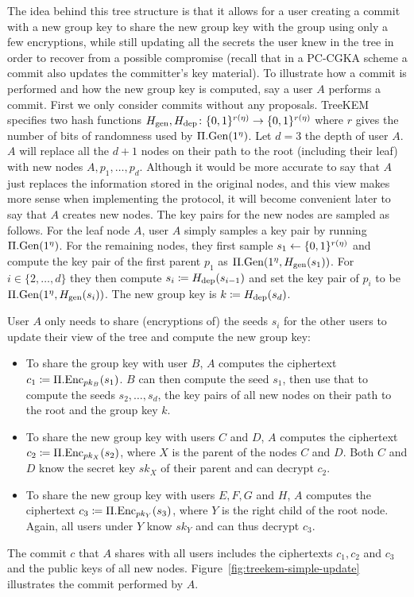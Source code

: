 The idea behind this tree structure is that it allows for a user creating a commit with a new group key to share the new group key with the group using only a few encryptions, while still updating all the secrets the user knew in the tree in order to recover from a possible compromise (recall that in a PC-CGKA scheme a commit also updates the committer's key material).
To illustrate how a commit is performed and how the new group key is computed, say a user $A$ performs a commit. First we only consider commits without any proposals. TreeKEM specifies two hash functions $H_\mathrm{gen}, H_\mathrm{dep} \colon \{0, 1\}^{r(\eta)} \to \{0, 1\}^{r(\eta)}$ where $r$ gives the number of bits of randomness used by $\Pi.\mathrm{Gen}(1^\eta)$. Let $d = 3$ the depth of user $A$. $A$ will replace all the $d + 1$ nodes on their path to the root (including their leaf) with new nodes $A, p_1, \ldots, p_d$. Although it would be more accurate to say that $A$ just replaces the information stored in the original nodes, and this view makes more sense when implementing the protocol, it will become convenient later to say that $A$ creates new nodes.
The key pairs for the new nodes are sampled as follows. For the leaf node $A$, user $A$ simply samples a key pair by running $\Pi.\mathrm{Gen}(1^\eta)$. For the remaining nodes, they first sample $s_1 \leftarrow \{0, 1\}^{r(\eta)}$ and compute the key pair of the first parent $p_1$ as $\Pi.\mathrm{Gen}(1^\eta, H_\mathrm{gen}(s_1))$. For $i \in \{2, \ldots, d\}$ they then compute $s_i \coloneqq H_\mathrm{dep}(s_{i - 1})$ and set the key pair of $p_i$ to be $\Pi.\mathrm{Gen}(1^\eta, H_\mathrm{gen}(s_i))$. The new group key is $k \coloneqq H_\mathrm{dep}(s_{d})$.

User $A$ only needs to share (encryptions of) the seeds $s_i$ for the other users to update their view of the tree and compute the new group key:
\begin{itemize}
	\item To share the group key with user $B$, $A$ computes the ciphertext $c_1 \coloneqq \Pi.\mathrm{Enc}_{pk_B}(s_1)$. $B$ can then compute the seed $s_1$, then use that to compute the seeds $s_2, \ldots, s_d$, the key pairs of all new nodes on their path to the root and the group key $k$.
	\item To share the new group key with users $C$ and $D$, $A$ computes the ciphertext $c_2 \coloneqq \Pi.\mathrm{Enc}_{pk_X}(s_2)$, where $X$ is the parent of the nodes $C$ and $D$. Both $C$ and $D$ know the secret key $sk_X$ of their parent and can decrypt $c_2$.
	\item To share the new group key with users $E, F, G$ and $H$, $A$ computes the ciphertext $c_3 \coloneqq \Pi.\mathrm{Enc}_{pk_Y}(s_3)$, where $Y$ is the right child of the root node. Again, all users under $Y$ know $sk_Y$ and can thus decrypt $c_3$.
\end{itemize}
The commit $c$ that $A$ shares with all users includes the ciphertexts $c_1, c_2$ and $c_3$ and the public keys of all new nodes. Figure~\ref{fig:treekem-simple-update} illustrates the commit performed by $A$.


